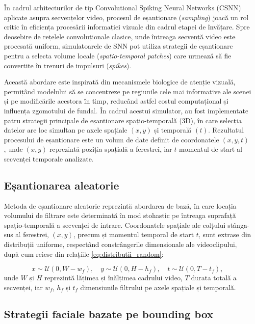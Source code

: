 În cadrul arhitecturilor de tip Convolutional Spiking Neural Networks (CSNN) aplicate asupra secvențelor video, procesul de eșantionare (\textit{sampling}) joacă un rol critic în eficiența procesării informației vizuale din cadrul etapei de învățare. Spre deosebire de rețelele convoluționale clasice, unde întreaga secvență video este procesată uniform, simulatoarele de SNN pot utiliza strategii de eșantionare pentru a selecta volume locale (\textit{spatio-temporal patches}) care urmează să fie convertite în trenuri de impulsuri (\textit{spikes}).

Această abordare este inspirată din mecanismele biologice de atenție vizuală, permițând modelului să se concentreze pe regiunile cele mai informative ale scenei și pe modificările acestora în timp, reducând astfel costul computațional și influența zgomotului de fundal. În cadrul acestui simulator, au fost implementate patru strategii principale de eșantionare spațio-temporală (3D), în care selecția datelor are loc simultan pe axele spațiale $(x, y)$ și temporală $(t)$. Rezultatul procesului de eșantionare este un volum de date definit de coordonatele $(x, y, t)$, unde $(x, y)$ reprezintă poziția spațială a ferestrei, iar $t$ momentul de start al secvenței temporale analizate.

\subsection*{Eșantionarea aleatorie}

Metoda de eșantionare aleatorie reprezintă abordarea de bază, în care locația volumului de filtrare este determinată în mod stohastic pe întreaga suprafață spațio-temporală a secvenței de intrare. Coordonatele spațiale ale colțului stânga-sus al ferestrei, $(x, y)$, precum și momentul temporal de start $t$, sunt extrase din distribuții uniforme, respectând constrângerile dimensionale ale videoclipului, după cum reiese din relațiile \eqref{eq:distributii_random}:

\begin{equation}
	\label{eq:distributii_random}
	x \sim \mathcal{U}(0, W - w_f), \quad
	y \sim \mathcal{U}(0, H - h_f), \quad
	t \sim \mathcal{U}(0, T - t_f),
\end{equation}
unde $W$ și $H$ reprezintă lățimea și înălțimea cadrului video, $T$ durata totală a secvenței, iar $w_f$, $h_f$ și $t_f$ dimensiunile filtrului pe axele spațiale și temporală.

\subsection*{Strategii faciale bazate pe bounding box}

